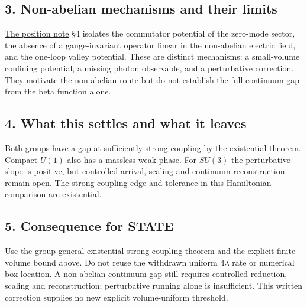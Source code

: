 \documentclass[11pt,a4paper]{article}
\begin{document}
\subsection{3. Non-abelian mechanisms and their
limits}\label{non-abelian-mechanisms-and-their-limits}

\href{mass-gap-position.md}{The position note} §4 isolates the
commutator potential of the zero-mode sector, the absence of a
gauge-invariant operator linear in the non-abelian electric field, and
the one-loop valley potential. These are distinct mechanisms: a
small-volume confining potential, a missing photon observable, and a
perturbative correction. They motivate the non-abelian route but do not
establish the full continuum gap from the beta function alone.

\subsection{4. What this settles and what it
leaves}\label{what-this-settles-and-what-it-leaves}

Both groups have a gap at sufficiently strong coupling by the
existential theorem. Compact \(U(1)\) also has a massless weak phase.
For \(SU(3)\) the perturbative slope is positive, but controlled
arrival, scaling and continuum reconstruction remain open. The
strong-coupling edge and tolerance in this Hamiltonian comparison are
existential.

\subsection{5. Consequence for STATE}\label{consequence-for-state}

Use the group-general existential strong-coupling theorem and the
explicit finite-volume bound above. Do not reuse the withdrawn uniform
\(4\lambda\) rate or numerical box location. A non-abelian continuum gap
still requires controlled reduction, scaling and reconstruction;
perturbative running alone is insufficient. This written correction
supplies no new explicit volume-uniform threshold.
\end{document}
